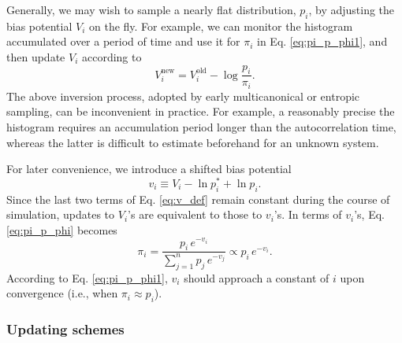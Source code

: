 \documentclass[reprint]{revtex4-1}
\begin{document}
Generally, we may wish to sample
a nearly flat distribution\cite{dayal2004, trebst2004}, $p_i$,
by adjusting the bias potential $V_i$
on the fly.
%
For example,
we can monitor the histogram accumulated over
a period of time and use it for $\pi_i$ in
Eq. \eqref{eq:pi_p_phi1},
and then update
$V_i$ according to
$$
V_i^{\mathrm{new}}
=
V_i^{\mathrm{old}}
-
\log \frac{ p_i } { \pi_i }.
$$
%
%
The above inversion process,
adopted by early multicanonical or
entropic sampling\cite{berg1992, lee1993},
can be inconvenient in practice.
%
For example, a reasonably precise the histogram
requires an accumulation period
longer than the autocorrelation time,
whereas the latter is difficult to
estimate beforehand for an unknown system.


For later convenience, we introduce a shifted bias potential
%
\begin{equation}
  v_i \equiv V_i - \ln p^*_i + \ln p_i.
  \label{eq:v_def}
\end{equation}
%
Since the last two terms of Eq. \eqref{eq:v_def}
remain constant during the course of simulation,
updates to $V_i$'s are equivalent to those to $v_i$'s.
%
In terms of $v_i$'s, Eq. \eqref{eq:pi_p_phi}
becomes
%
\begin{equation}
  \pi_i
  =
  \frac{                p_i \, e^{-v_i} }
       { \sum_{j = 1}^n p_j \, e^{-v_j} }
  \propto
  p_i \, e^{-v_i}.
  \label{eq:pi_p_v}
\end{equation}
%
According to Eq. \eqref{eq:pi_p_phi1},
$v_i$ should approach a constant of $i$
upon convergence (i.e., when $\pi_i \approx p_i$).




\subsubsection{Updating schemes}
\end{document}
